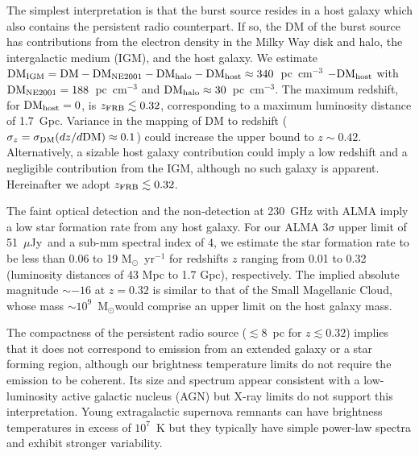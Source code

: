\documentclass{nature_frb}
\newcommand{\Msun}{M$_\odot$}
\newcommand{\uJy}{$\mu$Jy}
\newcommand{\DM}{\rm DM}
\newcommand{\DMigm}{\rm DM_{\rm IGM}}
\begin{document}
The simplest interpretation is that the burst source resides in a host galaxy which also contains the persistent radio counterpart.
If so, the DM of the burst source has contributions from the electron density in the Milky Way disk and halo\cite{cl02}, the intergalactic medium (IGM)\cite{ino04}, and the host galaxy.  We estimate $\DMigm = \DM - \DM_{\rm NE2001} - \DM_{\rm halo} - \DM_{\rm host} \approx 340$~pc~cm$^{-3}$ $- \DM_{\rm host}$  with $\DM_{\rm NE2001} = 188$~pc~cm$^{-3}$ and  $\DM_{\rm halo} \approx 30$~pc~cm$^{-3}$. The maximum redshift, for $\DM_{\rm host} = 0$, is $z_{\rm FRB} \lesssim 0.32$,  corresponding to a maximum luminosity distance of 1.7~Gpc.
Variance in the mapping of DM to redshift\cite{mcq14} ($\sigma_z = \sigma_{\rm DM} (dz/d\DM)\approx 0.1$) could increase the upper bound to $z \sim 0.42$.
Alternatively, a sizable host galaxy contribution could imply a low redshift and a negligible contribution from the IGM, although no such galaxy is apparent. Hereinafter we adopt $z_{\rm FRB} \lesssim 0.32$.

The faint optical detection and the non-detection at 230~GHz with ALMA imply a low star formation rate from any host galaxy.  For our ALMA 3$\sigma$ upper limit of 51~\uJy\ and a sub-mm spectral index of 4, we estimate the star formation rate\cite{cy99} to be less than 0.06 to 19 \Msun~yr$^{-1}$ for redshifts $z$ ranging from 0.01 to 0.32 (luminosity distances of 43 Mpc to 1.7 Gpc), respectively.  The implied absolute magnitude $\sim -16$ at $z = 0.32$ is similar to that of the Small Magellanic Cloud, whose mass $\sim 10^9$~\Msun  would comprise an upper limit on the host galaxy mass.

The compactness of the persistent radio source ($\lesssim$8~pc for $z \lesssim 0.32$) implies that it does not correspond to emission from an extended galaxy or a star forming region\cite{condon92}, although our brightness temperature limits do not require the emission to be coherent.
Its size and  spectrum appear consistent with a low-luminosity active galactic nucleus (AGN) but X-ray limits do not support this interpretation.
Young extragalactic supernova remnants\cite{ldt+06} can have brightness temperatures in excess of $10^7$~K but they typically have simple power-law spectra and exhibit stronger variability.
\end{document}
